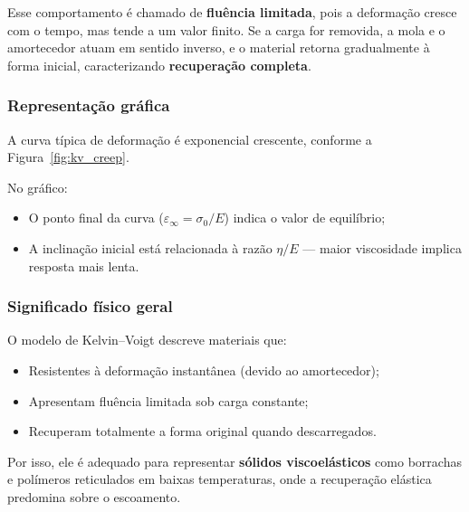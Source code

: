 Esse comportamento é chamado de \textbf{fluência limitada}, pois a deformação cresce com o tempo, mas tende a um valor finito.  
Se a carga for removida, a mola e o amortecedor atuam em sentido inverso, e o material retorna gradualmente à forma inicial, caracterizando \textbf{recuperação completa}.

\subsubsection*{Representação gráfica}
A curva típica de deformação é exponencial crescente, conforme a Figura~\ref{fig:kv_creep}.


No gráfico:
\begin{itemize}
    \item O ponto final da curva ($\varepsilon_\infty = \sigma_0/E$) indica o valor de equilíbrio;
    \item A inclinação inicial está relacionada à razão $\eta/E$ — maior viscosidade implica resposta mais lenta.
\end{itemize}

\subsubsection*{Significado físico geral}
O modelo de Kelvin--Voigt descreve materiais que:
\begin{itemize}
    \item Resistentes à deformação instantânea (devido ao amortecedor);
    \item Apresentam fluência limitada sob carga constante;
    \item Recuperam totalmente a forma original quando descarregados.
\end{itemize}

Por isso, ele é adequado para representar \textbf{sólidos viscoelásticos} como borrachas e polímeros reticulados em baixas temperaturas, onde a recuperação elástica predomina sobre o escoamento.




